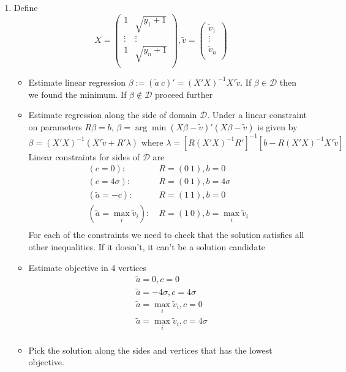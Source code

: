 \documentclass[12pt]{article}
\begin{document}
\begin{enumerate}
	\item Define 
	\[X = \begin{pmatrix}
		1 & \sqrt{y_1 + 1} \\
		\vdots & \vdots \\
		1 & \sqrt{y_n + 1} \\
	\end{pmatrix}, \tilde{v} = \begin{pmatrix}
		\tilde{v}_1 \\
		\vdots \\
		\tilde{v}_n \\
	\end{pmatrix}\]
	\begin{itemize}
		\item Estimate linear regression $\beta := (\tilde{a} \ c)' = (X'X)^{-1}X'\tilde{v}$. If $\beta \in \mathcal{D}$ then we found the minimum. If $\beta \notin \mathcal{D}$ proceed further
		\item Estimate regression along the side of domain $\mathcal{D}$. Under a linear constraint on parameters $R\beta = b$, $\beta = \arg\min (X\beta - \tilde{v})'(X\beta - \tilde{v})$ is given by
		\[\beta = (X'X)^{-1}(X'\tilde{v} + R'\lambda) \text{ where } \lambda = \left[R(X'X)^{-1}R'\right]^{-1}\left[b - R(X'X)^{-1}X'\tilde{v}\right]\]
		Linear constraints for sides of $\mathcal{D}$ are
		\[\begin{aligned}
			(c=0): \ & R = (0 \ 1), b = 0\\
			(c=4\sigma): \ & R = (0 \ 1), b = 4\sigma\\
			(\tilde{a} = -c): \ & R = (1 \ 1), b = 0\\
			(\tilde{a} = \max_i \tilde{v}_i): \ & R = (1 \ 0), b = \max_i \tilde{v}_i\\
		\end{aligned}\]
		For each of the constraints we need to check that the solution satisfies all other inequalities. If it doesn't, it can't be a solution candidate
		\item Estimate objective in 4 vertices
		\[\begin{aligned}
			& \tilde{a} = 0, c=0 \\
			& \tilde{a} = -4\sigma, c=4\sigma \\
			& \tilde{a} = \max_i \tilde{v}_i, c = 0 \\
			& \tilde{a} = \max_i \tilde{v}_i, c = 4\sigma \\
		\end{aligned}\]
		\item Pick the solution along the sides and vertices that has the lowest objective.
	\end{itemize}
	
\end{enumerate}
\end{document}
